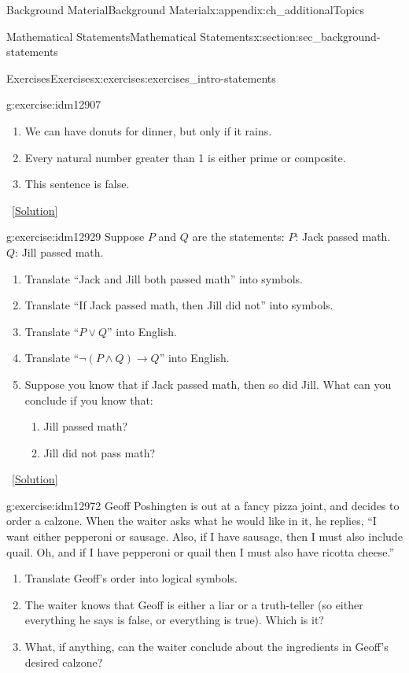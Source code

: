 \documentclass[oneside,10pt,]{book}
\numberwithin{equation}{chapter}
\def\imp{\rightarrow}
\begin{document}
\begin{appendixptx}{Background Material}{}{Background Material}{}{}{x:appendix:ch_additionalTopics}
\begin{sectionptx}{Mathematical Statements}{}{Mathematical Statements}{}{}{x:section:sec_background-statements}
\begin{exercises-subsection}{Exercises}{}{Exercises}{}{}{x:exercises:exercises_intro-statements}
\begin{divisionexercise}{1}{}{}{g:exercise:idm12907}
\begin{enumerate}[label=(\alph*)]
\item{}We can have donuts for dinner, but only if it rains.%
\item{}Every natural number greater than 1 is either prime or composite.%
\item{}This sentence is false.%
\end{enumerate}
%
\qquad~\hfill{\tiny\hyperlink{g:solution:idm12917-main}{[Solution]}}\end{divisionexercise}%
\begin{divisionexercise}{2}{}{}{g:exercise:idm12929}%
Suppose \(P\) and \(Q\) are the statements: \(P\): Jack passed math. \(Q\): Jill passed math.%
%
\begin{enumerate}[label=(\alph*)]
\item{}Translate ``Jack and Jill both passed math'' into symbols.%
\item{}Translate ``If Jack passed math, then Jill did not'' into symbols.%
\item{}Translate ``\(P \vee Q\)'' into English.%
\item{}Translate ``\(\neg(P \wedge Q) \imp Q\)'' into English.%
\item{}Suppose you know that if Jack passed math, then so did Jill.  What can you conclude if you know that:%
\begin{enumerate}[label=\roman*.]
\item{}Jill passed math?%
\item{}Jill did not pass math?%
\end{enumerate}
%
\end{enumerate}
\qquad~\hfill{\tiny\hyperlink{g:solution:idm12956-main}{[Solution]}}\end{divisionexercise}%
\begin{divisionexercise}{3}{}{}{g:exercise:idm12972}%
Geoff Poshingten is out at a fancy pizza joint, and decides to order a calzone. When the waiter asks what he would like in it, he replies, ``I want either pepperoni or sausage. Also, if I have sausage, then I must also include quail. Oh, and if I have pepperoni or quail then I must also have ricotta cheese.''%
%
\begin{enumerate}[label=(\alph*)]
\item{}Translate Geoff's order into logical symbols.%
\item{}The waiter knows that Geoff is either a liar or a truth-teller (so either everything he says is false, or everything is true).  Which is it?%
\item{}What, if anything, can the waiter conclude about the ingredients in Geoff's desired calzone?%

\end{enumerate}
\end{divisionexercise}
\end{exercises-subsection}
\end{sectionptx}
\end{appendixptx}
\end{document}
